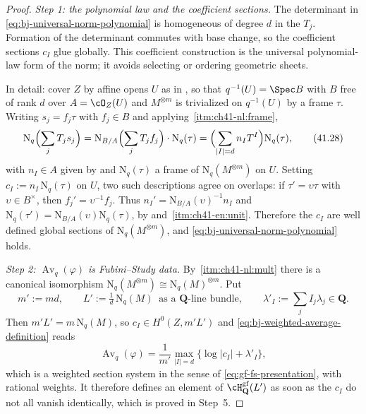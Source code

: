 \begin{proof}
\noindent\emph{Step 1: the polynomial law and the coefficient sections.}
The determinant in \eqref{eq:bj-universal-norm-polynomial} is homogeneous
of degree $d$ in the $T_j$.  Formation of the determinant commutes with
base change, so the coefficient sections $c_I$ glue globally.  This
coefficient construction is the universal polynomial-law form of the norm;
it avoids selecting or ordering geometric sheets.

In detail: cover $Z$ by affine opens $U$ as in
, so that $q^{-1}(U)=\Spec B$ with $B$ free
of rank $d$ over $A=\cO_Z(U)$ and $M^{\otimes m}$ is trivialized on
$q^{-1}(U)$ by a frame $\tau$.  Writing $s_j=f_j\tau$ with
$f_j\in B$ and applying
\,\cref{itm:ch41-nl:frame},
\[
 \mathrm N_q\Bigl(\sum_jT_js_j\Bigr)
 =\mathrm N_{B/A}\Bigl(\sum_jT_jf_j\Bigr)\cdot\mathrm N_q(\tau)
 =\Bigl(\sum_{|I|=d}n_IT^I\Bigr)\mathrm N_q(\tau),
\tag{41.28}\label{eq:ch41-local-coefficients}
\]
with $n_I\in A$ given by  and
$\mathrm N_q(\tau)$ a frame of $\mathrm N_q(M^{\otimes m})$ on $U$.
Setting $c_I:=n_I\,\mathrm N_q(\tau)$ on $U$, two such descriptions
agree on overlaps: if $\tau'=\upsilon\tau$ with $\upsilon\in B^\times$, then
$f_j'=\upsilon^{-1}f_j$.  Thus $n_I'=\mathrm N_{B/A}(\upsilon)^{-1}n_I$
and $\mathrm N_q(\tau')=\mathrm N_{B/A}(\upsilon)\mathrm N_q(\tau)$, by
 and
\,\cref{itm:ch41-en:unit}.  Therefore the
$c_I$ are well defined global sections of
$\mathrm N_q(M^{\otimes m})$, and
\eqref{eq:bj-universal-norm-polynomial} holds.

\medskip
\noindent\emph{Step 2: $\operatorname{Av}_q(\varphi)$ is Fubini--Study data.}
By
\,\cref{itm:ch41-nl:mult} there is a
canonical isomorphism
$\mathrm N_q(M^{\otimes m})\cong\mathrm N_q(M)^{\otimes m}$.  Put
\[
 m':=md,
 \qquad
 L':=\tfrac1d\,\mathrm N_q(M)\ \text{ as a }\mathbf Q\text{-line bundle},
 \qquad
 \lambda'_I:=\sum_jI_j\lambda_j\in\mathbf Q .
\]
Then $m'L'=m\,\mathrm N_q(M)$, so $c_I\in H^0(Z,m'L')$ and
\eqref{eq:bj-weighted-average-definition} reads
\[
 \operatorname{Av}_q(\varphi)
 =\frac1{m'}\max_{|I|=d}\bigl\{\log|c_I|+\lambda'_I\bigr\},
\]
which is a weighted section system in the sense of
\eqref{eq:gf-fs-presentation}, with rational weights.  It therefore defines
an element of $\cH^{\mathrm{gf}}_{\mathbf Q}(L')$ as soon as the $c_I$
do not all vanish identically, which is proved in Step~5.


\end{proof}
